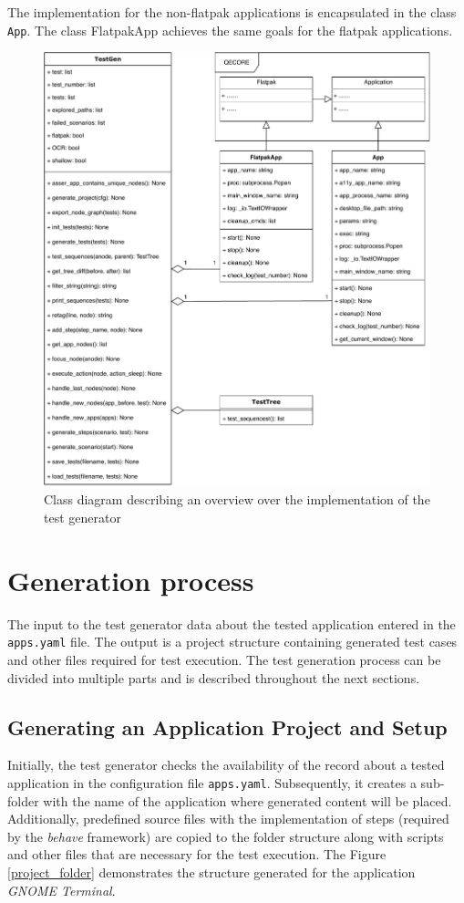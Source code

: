 The implementation for the non-flatpak applications is encapsulated in the class \texttt{App}. The class {FlatpakApp} achieves the same goals for the flatpak applications.

\begin{figure}[H]
	\centering
	\includegraphics[width=1\textwidth,clip]{obrazky-figures/TestGen_class_diagram.pdf}
	\caption{Class diagram describing an overview over the implementation of the test generator}
	\label{test_gen}
\end{figure}

\section{Generation process}
The input to the test generator data about the tested application entered in the \texttt{apps.yaml} file. The output is a project structure containing generated test cases and other files required for test execution. The test generation process can be divided into multiple parts and is described throughout the next sections.

\subsection{Generating an Application Project and Setup}
Initially, the test generator checks the availability of the record about a tested application in the configuration file \texttt{apps.yaml}. Subsequently, it creates a sub-folder with the name of the application where generated content will be placed. Additionally, predefined source files with the implementation of steps (required by the \textit{behave} framework) are copied to the folder structure along with scripts and other files that are necessary for the test execution. The Figure \ref{project_folder} demonstrates the structure generated for the application \textit{GNOME Terminal}.

